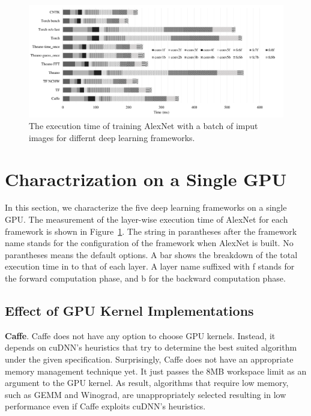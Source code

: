 \begin{figure}[htbp]
  \centering
  \includegraphics[width=\linewidth]{./figures/time_frameworks}
  \caption{%
The execution time of training AlexNet with a batch of imput images for differnt deep learning frameworks. 
\label{fig_time_frameworks}
  }
\end{figure}


\section{Charactrization on a Single GPU}
\label{sec:singlGPU}
In this section, we characterize the five deep learning frameworks on a single GPU. The measurement of the layer-wise execution time of AlexNet for each framework is shown in Figure~\ref{fig_time_frameworks}. The string in parantheses after the framework name stands for the configuration of the framework when AlexNet is built. No parantheses means the default options. A bar shows the breakdown of the total execution time in to that of each layer. A layer name suffixed with \textsf{f} stands for the forward computation phase, and \textsf{b} for the backward computation phase.

\subsection{Effect of GPU Kernel Implementations}
{\bf Caffe}. Caffe does not have any option to choose GPU kernels. Instead, it depends on cuDNN's heuristics that try to determine the best suited algorithm under the given specification. Surprisingly, Caffe does not have an appropriate memory management technique yet. It just passes the 8MB workspace limit as an argument to the GPU kernel. As result, algorithms that require low memory, such as GEMM and Winograd, are unappropriately selected resulting in low performance even if Caffe exploits cuDNN's heuristics. 

